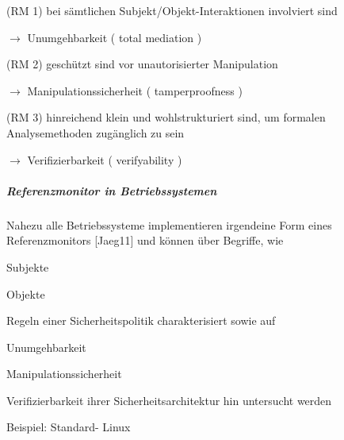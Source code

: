 \documentclass[a4paper]{article}
\begin{document}
\begin{multicols}{3}
    \begin{itemize*}
        \item
        (RM 1) bei sämtlichen Subjekt/Objekt-Interaktionen involviert sind
        \begin{itemize*}
            \item[$\rightarrow$] Unumgehbarkeit ( total mediation )
        \end{itemize*}
        \item
        (RM 2) geschützt sind vor unautorisierter Manipulation
        \begin{itemize*}
            \item[$\rightarrow$] Manipulationssicherheit ( tamperproofness )
        \end{itemize*}
        \item
        (RM 3) hinreichend klein und wohlstrukturiert sind, um formalen
        Analysemethoden zugänglich zu sein
        \begin{itemize*}
            \item[$\rightarrow$] Verifizierbarkeit ( verifyability )
        \end{itemize*}
    \end{itemize*}


    \subparagraph{Referenzmonitor in
        Betriebssystemen}

    Nahezu alle Betriebssysteme implementieren irgendeine Form eines
    Referenzmonitors [Jaeg11] und können über Begriffe, wie

    \begin{itemize*}
        \item
        Subjekte
        \item
        Objekte
        \item
        Regeln einer Sicherheitspolitik charakterisiert sowie auf
        \item
        Unumgehbarkeit
        \item
        Manipulationssicherheit
        \item
        Verifizierbarkeit ihrer Sicherheitsarchitektur hin untersucht werden
    \end{itemize*}

    Beispiel: Standard- Linux


\end{multicols}
\end{document}
